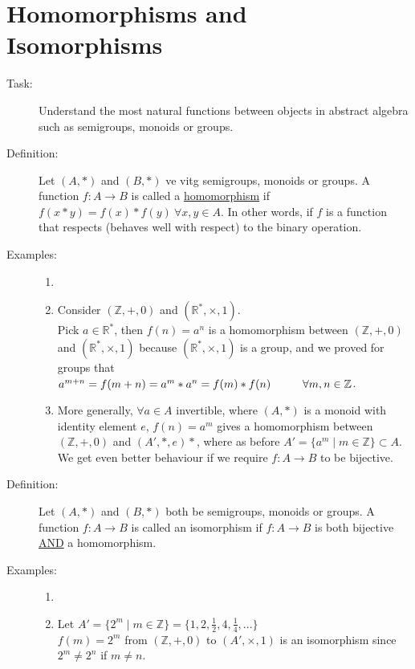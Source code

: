 \documentclass[10pt]{article}
\begin{document}
	\section{Homomorphisms and Isomorphisms}
	\begin{description}
		\item[Task:] Understand the most natural functions between objects in abstract algebra such as semigroups, monoids or groups.
		\item[Definition:] Let $(A, *)$ and $(B, *)$ ve vitg semigroups, monoids or groups. A function $f: A \rightarrow B$ is called a \underline{homomorphism} if $f(x * y) = f(x) * f(y) \: \forall x, y \in A$. In other words, if $f$ is a function that respects (behaves well with respect) to the binary operation.
		\item[Examples:]
		\begin{enumerate}
			\item[]
			\item Consider $(\mathbb{Z}, +, 0)$ and $(\mathbb{R}^*, \times, 1)$. \\
			Pick $a \in \mathbb{R}^*$, then $f(n) = a^n$ is a homomorphism between $(\mathbb{Z}, +, 0)$ and $(\mathbb{R}^*, \times, 1)$ because $(\mathbb{R}^*, \times, 1)$ is a group, and we proved for groups that $a^{m+n} = f(m+n) = a^m * a^n = f(m) * f(n) \hspace{10mm} \forall m, n \in \mathbb{Z}$.
			\item More generally, $\forall a \in A$ invertible, where $(A, *)$ is a monoid with identity element $e$, $f(n) = a^m$ gives a homomorphism between $(\mathbb{Z}, +, 0)$ and $(A', *, e)*$, where as before $A' = \{a^m \mid m \in \mathbb{Z}\} \subset A$. \\
			We get even better behaviour if we require $f:A \rightarrow B$ to be bijective.
		\end{enumerate}
		\item[Definition:] Let $(A, *)$ and $(B, *)$ both be semigroups, monoids or groups. A function $f:A \rightarrow B$ is called an isomorphism if  $f:A \rightarrow B$ is both bijective \underline{AND} a homomorphism.
		\item[Examples:]
		\begin{enumerate}
			\item[]
			\item Let $A' = \{2^m \mid m \in \mathbb{Z}\} = \{1, 2, \frac{1}{2}, 4, \frac{1}{4}, ...\}$ \\
			$f(m) = 2^m$ from $(\mathbb{Z}, +, 0)$ to $(A', \times, 1)$ is an isomorphism since $2^m \neq 2^n$ if $m \neq n$.

\end{enumerate}
\end{description}
\end{document}
